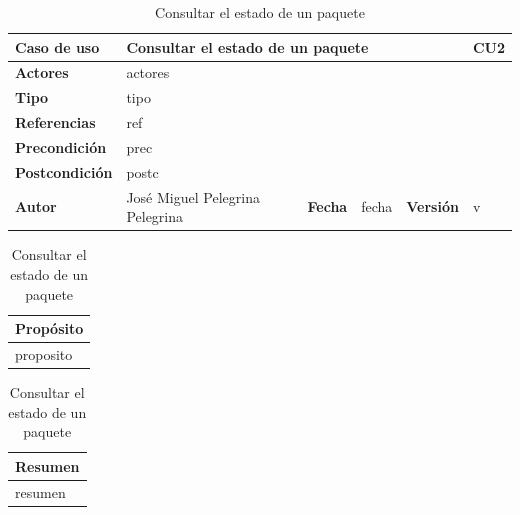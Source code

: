 \documentclass[12pt,spanish]{article}
\begin{document}
\begin{table}[H]
\centering
\begin{tabular}{|m{3cm}|m{4cm}|m{2cm}|m{2cm}|m{2cm}|m{1cm}|}
\hline
\textbf{Caso de uso} &  \multicolumn{4}{m{8cm}|}{Consultar el estado de un paquete} \vline &  \cellcolor{gray!40}CU2 \\
\hline
\textbf{Actores} & \multicolumn{5}{m{8cm}|}{actores} \\
\hline
\textbf{Tipo} & \multicolumn{5}{m{8cm}|}{tipo} \\
\hline
\textbf{Referencias} &\multicolumn{5}{m{8cm}|}{ref} \\
\hline
\textbf{Precondición} & \multicolumn{5}{m{8cm}|}{prec} \\
\hline
\textbf{Postcondición} & \multicolumn{5}{m{8cm}|}{postc} \\
\hline
\textbf{Autor} & José Miguel Pelegrina Pelegrina & \textbf{Fecha} & fecha & \textbf{Versión} & v \\
\hline
\end{tabular}

\vspace{1cm}

\begin{tabular}{|m{16.2cm}|}
\hline
\textbf{Propósito} \\
\hline
proposito \\
\hline
\end{tabular}

\vspace{1cm}

\begin{tabular}{|m{16.2cm}|}
\hline
\textbf{Resumen} \\
\hline
resumen \\
\hline
\end{tabular}

\caption{Consultar el estado de un paquete}
\label{cu:2}
\end{table}
 

\end{document}
